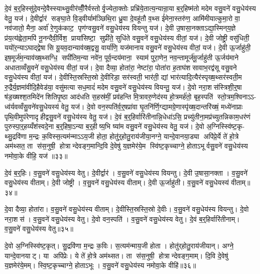 दे॒वं ब॒र्॒हिस्सु॑दे॒वन्दे॒वैस्स्याथ्सु॒वीर॑व्वीँ॒रैर्वस्तोर्वृ॒ज्येता॒क्तोः प्रभ्रि॑ये॒तात्य॒न्यान्रा॒या ब॒र्॒हिष्म॑तो मदेम वसु॒वने॑ वसु॒धेय॑स्य वेतु॒ यज॑। दे॒वीर्द्वार॑ सङ्घा॒ते वि॒ड्वीर्याम॑ञ्छिथि॒रा ध्रु॒वा दे॒वहू॑तौ व॒थ्स ई॑मेना॒स्तरु॑ण॒ आमि॑मीयात्कुमा॒रो वा॒ नव॑जातो॒ मैना॒ अर्वा॑ रे॒णुक॑काट॒ पृण॑ग्वसु॒वने॑ वसु॒धेय॑स्य वियन्तु यज॑। दे॒वी उ॒षासा॒नक्ताऽद्या॒स्मिन्‌य॒ज्ञे प्र॑य॒त्य॑ह्वेता॒मपि॑ नू॒नन्दैवी॒र्विश॒ प्राया॑सिष्टा॒ सुप्री॑ते॒ सुधि॑ते वसु॒वने॑ वसु॒धेय॑स्य वीतां॒ यज॑। दे॒वी जोष्ट्री॒ वसु॑धिती॒ ययो॑र॒न्याऽघाद्द्वेषासि यू॒यव॒दान्याव॑ख्ष॒द्वसु॒ वार्या॑णि॒ यज॑मानाय वसु॒वने॑ वसु॒धेय॑स्य वीतां॒ यज॑। दे॒वी ऊ॒र्जाहु॑ती॒ इष॒मूर्ज॑म॒न्याव॑ख्ष॒थ्सग्धि॒ सपी॑तिम॒न्या नवे॑न॒ पूर्व॒न्दय॑माना॒ स्याम॑ पुरा॒णेन॒ नव॒न्तामूर्ज॑मू॒र्जाहु॑ती ऊ॒र्जय॑माने अधाताव्वँसु॒वने॑ वसु॒धेय॑स्य वीतां॒ यज॑। दे॒वा दैव्या॒ होता॑रा॒ नेष्टा॑रा॒ पोता॑रा ह॒ताघ॑शसावाभ॒रद्व॑सू वसु॒वने वसु॒धेय॑स्य वीतां॒ यज॑। दे॒वीस्ति॒स्रस्ति॒स्रो दे॒वीरिडा॒ सर॑स्वती॒ भार॑ती॒ द्यां भार॑त्यादि॒त्यैर॑स्पृख्ष॒थ्सर॑स्वती॒म रु॒द्रैर्य॒ज्ञमा॑वीदि॒हैवेड॑या॒ वसु॑मत्या सध॒मादं॑ मदेम वसु॒वने॑ वसु॒धेय॑स्य वियन्तु॒ यज॑। दे॒वो नरा॒शस॑स्त्रिशी॒र्॒षा ष॑ड॒ख्षश्श॒तमिदे॑नशितिपृ॒ष्ठा आद॑धति स॒हस्र॑मीं॒ प्रव॑हन्ति मि॒त्रावरु॒णेद॑स्य हो॒त्रमर्\mbox{}ह॑तो॒ बृह॒स्पति॑ स्तो॒त्रम॒श्विनाऽऽ- ध्व॑र्यवव्वँसु॒वने॑वसु॒धेयस्य॑ वेतु॒ यज॑। दे॒वो वन॒स्पति॑र्व॒र्॒षप्रा॑वा घृ॒तनि॑र्णि॒ग्द्यामग्रे॒णास्पृ॑ख्ष॒दान्तरि॑ख्षं॒ मध्ये॑नाप्राः पृथि॒वीमुप॑रेणादृहीद्वसु॒वने॑ वसु॒धेय॑स्य वेतु॒ यज॑। दे॒वं ब॒र्॒हिर्वारि॑तीनान्नि॒धेधा॑ऽसि॒ प्रच्यु॑तीना॒मप्र॑च्युतन्निकाम॒धर॑णं पुरुस्पा॒र्॒हय्यँश॑स्वदे॒ना ब॒र्॒हिषा॒ऽन्या ब॒र्॒हीष्य॒भि ष्या॑म वसु॒वने॑ वसु॒धेय॑स्य वेतु॒ यज॑। दे॒वो अ॒ग्निस्स्वि॑ष्ट॒कृ- थ्सु॒द्रवि॑णा म॒न्द्रः क॒विस्स॒त्यम॑न्माऽऽय॒जी होता॒ होतु॑र्॒होतु॒राय॑जीया॒नग्ने॒ यान्दे॒वानया॒ड्या अपि॑प्रे॒र्ये ते॑ हो॒त्रे अम॑थ्सत॒ ता स॑स॒नुषी॒ होत्रान्देवङ्ग॒मान्दि॒वि दे॒वेषु॑ य॒ज्ञमेर॑ये॒म स्वि॑ष्ट॒कृच्चाग्ने॒ होताऽभूर्वसु॒वने॑ वसु॒धेय॑स्य नमोवा॒के वीहि॒ यज॑ ॥३३॥\anuvakamend[यजैक॑ञ्च]

दे॒वं ब॒र्॒हिः। व॒सु॒वने॑ वसु॒धेय॑स्य वेतु। दे॒वीर्द्वार॑। व॒सु॒वने॑ वसु॒धेय॑स्य वियन्तु। दे॒वी उ॒षासा॒नक्ता। व॒सु॒वने॑ वसु॒धेय॑स्य वीताम्। दे॒वी जोष्ट्री। व॒सु॒वने॑ वसु॒धेय॑स्य वीताम्। दे॒वी ऊ॒र्जाहु॑ती। व॒सु॒वने॑ वसु॒धेयस्य॑ वीताम्॥३४॥

दे॒वा दैव्या॒ होता॑रा। व॒सु॒वने॑ वसु॒धेय॑स्य वीताम्। दे॒वीस्ति॒स्रस्ति॒स्रो दे॒वीः। व॒सु॒वने॑ वसु॒धेय॑स्य वियन्तु। दे॒वो नरा॒शस॑। व॒सु॒वने॑ वसु॒धेय॑स्य वेतु। दे॒वो वन॒स्पति॑। व॒सु॒वने॑ वसु॒धेय॑स्य वेतु। दे॒वं ब॒र्॒हिर्वारि॑तीनाम्। व॒सु॒वने॑ वसु॒धेय॑स्य वेतु॥३५॥

दे॒वो अ॒ग्निस्स्वि॑ष्ट॒कृत्। सु॒द्रवि॑णा म॒न्द्रः क॒विः। स॒त्यम॑न्माय॒जी होता। होतु॑र्‌होतु॒राय॑जीयान्। अग्ने॒ यान्दे॒वानयाट्। या अपि॑प्रेः। ये ते॑ हो॒त्रे अम॑थ्सत। ता स॑स॒नुषी॒ होत्रान्देवङ्ग॒माम्। दि॒वि दे॒वेषु॑ य॒ज्ञमेर॑ये॒मम्। स्वि॒ष्ट॒कृच्चाग्ने॒ होताऽभूः। व॒सु॒वने॑ वसु॒धेय॑स्य नमोवा॒के वीहि॑॥३६॥\anuvakamend[वी॒ता॒व्वेँ॒त्वभू॒रेक॑ञ्च]

